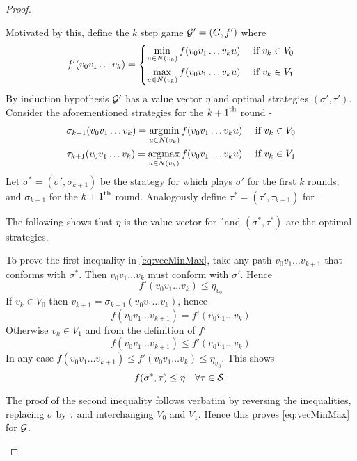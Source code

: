 \begin{proof}
\begin{description}
        Motivated by this, define the $k$ step game $\G'=(G,f')$ where
            \[
                f'(v_0v_1 \ldots v_k) = \begin{dcases}
                    \min_{ u \in N(v_k) } f(v_0 v_1 \ldots v_k u) & \tif v_k \in V_0\\
                    \max_{ u \in N(v_k) } f(v_0 v_1 \ldots v_k u) & \tif v_k \in V_1
                \end{dcases} 
            \]
            By induction hypothesis $\G'$ has a value vector $\eta$ and optimal strategies $(\sigma',\tau')$.
            Consider the aforementioned strategies for the $\nth[k+1]$ round -
            \begin{align*}
                \sigma_{k+1}(v_0 v_1 \ldots v_k) = \argmin_{ u \in N(v_k) } f(v_0 v_1 \ldots v_k u) \quad \tif v_k \in V_0 \\
                \tau_{k+1}(v_0 v_1 \ldots v_k) = \argmax_{ u \in N(v_k) } f(v_0 v_1 \ldots v_k u) \quad \tif v_k \in V_1
            \end{align*}
            Let $\sigma^*=(\sigma',\sigma_{k+1})$ be the strategy for  which plays $\sigma'$ for the first $k$ rounds, and $\sigma_{k+1}$ for the $\nth[k+1]$ round. Analogously define $\tau^*=(\tau',\tau_{k+1})$ for .
            
            The following shows that $\eta$ is the value vector for \G\ and $(\sigma^*,\tau^*)$ are the optimal strategies.
            
            To prove the first inequality in \eqref{eq:vecMinMax}, take any path $v_0v_1 \ldots v_{k+1}$ that conforms with $\sigma^*$. Then $v_0v_1 \ldots v_k$ must conform with $\sigma'$. Hence 
            \[
                f'(v_0 v_1 \ldots v_k) \leq \eta_{v_0}
            \]
            If $v_k \in V_0$ then $v_{k+1}=\sigma_{k+1}(v_0 v_1 \ldots v_k)$, hence 
            \[
                f(v_0v_1 \ldots v_{k+1}) = f'(v_0v_1 \ldots v_k)
            \]
            Otherwise $v_k \in V_1$ and from the definition of $f'$
            \[
                f(v_0v_1 \ldots v_{k+1}) \leq f'(v_0v_1 \ldots v_k)
            \]
            In any case $f(v_0 v_1 \ldots v_{k+1}) \leq f'(v_0 v_1 \ldots v_k) \leq \eta_{v_0}$. This shows
            \[
                f(\sigma^*,\tau) \leq \eta \quad \forall \tau \in \ST{1}
            \]

            The proof of the second inequality follows verbatim by reversing the inequalities, replacing $\sigma$ by $\tau$ and interchanging $V_0$ and $V_1$. Hence this proves \eqref{eq:vecMinMax} for $\G$.
    \end{description}
\end{proof}
